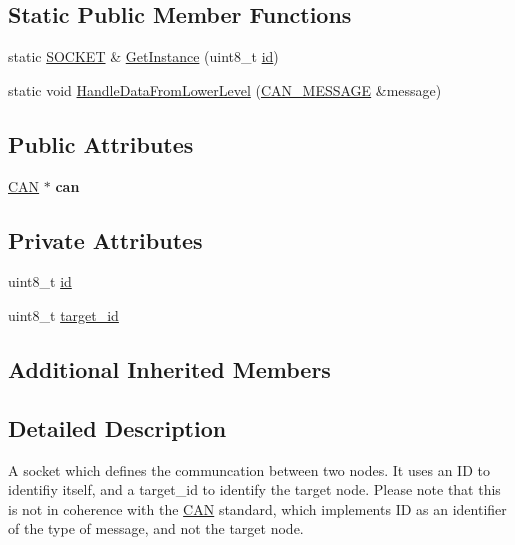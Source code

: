 \subsection*{Static Public Member Functions}
\begin{DoxyCompactItemize}
\item 
static \hyperlink{class_s_o_c_k_e_t}{S\-O\-C\-K\-E\-T} \& \hyperlink{class_s_o_c_k_e_t_a7b38d29ecb4258e2aa2abb3d95ef3784}{Get\-Instance} (uint8\-\_\-t \hyperlink{class_s_o_c_k_e_t_a0755fe74751c2d94d3d1679cad9e6544}{id})
\item 
static void \hyperlink{class_s_o_c_k_e_t_ab1345aded87c899fd525616b6f2cca4a}{Handle\-Data\-From\-Lower\-Level} (\hyperlink{struct_c_a_n___m_e_s_s_a_g_e}{C\-A\-N\-\_\-\-M\-E\-S\-S\-A\-G\-E} \&message)
\end{DoxyCompactItemize}
\subsection*{Public Attributes}
\begin{DoxyCompactItemize}
\item 
\hypertarget{class_s_o_c_k_e_t_a40e1973f231f6e5c51f02bfb8e7c0722}{\hyperlink{class_c_a_n}{C\-A\-N} $\ast$ {\bfseries can}}\label{class_s_o_c_k_e_t_a40e1973f231f6e5c51f02bfb8e7c0722}

\end{DoxyCompactItemize}
\subsection*{Private Attributes}
\begin{DoxyCompactItemize}
\item 
uint8\-\_\-t \hyperlink{class_s_o_c_k_e_t_a0755fe74751c2d94d3d1679cad9e6544}{id}
\item 
uint8\-\_\-t \hyperlink{class_s_o_c_k_e_t_a566ef7ae1ca5366f622bbe805954a031}{target\-\_\-id}
\end{DoxyCompactItemize}
\subsection*{Additional Inherited Members}


\subsection{Detailed Description}
A socket which defines the communcation between two nodes. It uses an I\-D to identifiy itself, and a target\-\_\-id to identify the target node. Please note that this is not in coherence with the \hyperlink{class_c_a_n}{C\-A\-N} standard, which implements I\-D as an identifier of the type of message, and not the target node. 

